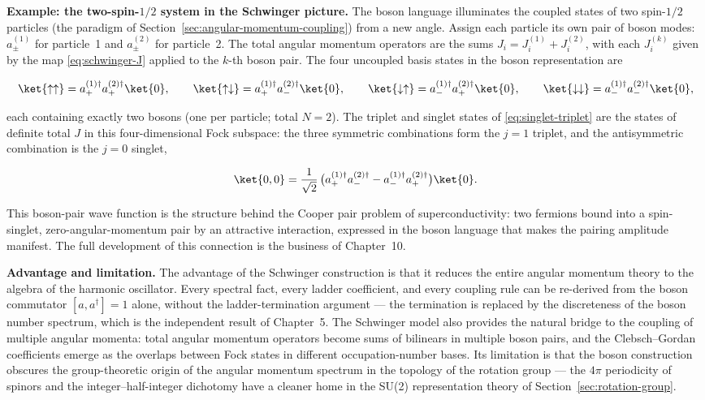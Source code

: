 \medskip\noindent\textbf{Example: the two-spin-$1/2$ system in the Schwinger picture.}
The boson language illuminates the coupled states of two spin-$1/2$ particles (the paradigm of Section~\ref{sec:angular-momentum-coupling}) from a new angle. Assign each particle its own pair of boson modes: $a_\pm^{(1)}$ for particle~1 and $a_\pm^{(2)}$ for particle~2. The total angular momentum operators are the sums $J_i = J_i^{(1)} + J_i^{(2)}$, with each $J_i^{(k)}$ given by the map \eqref{eq:schwinger-J} applied to the $k$-th boson pair. The four uncoupled basis states in the boson representation are
\begin{linenomath}
  \begin{equation*}
    \ket{\uparrow\uparrow} = a_+^{(1)\dagger} a_+^{(2)\dagger}\ket{0},\qquad
    \ket{\uparrow\downarrow} = a_+^{(1)\dagger} a_-^{(2)\dagger}\ket{0},\qquad
    \ket{\downarrow\uparrow} = a_-^{(1)\dagger} a_+^{(2)\dagger}\ket{0},\qquad
    \ket{\downarrow\downarrow} = a_-^{(1)\dagger} a_-^{(2)\dagger}\ket{0},
  \end{equation*}
\end{linenomath}
each containing exactly two bosons (one per particle; total $N = 2$). The triplet and singlet states of \eqref{eq:singlet-triplet} are the states of definite total $J$ in this four-dimensional Fock subspace: the three symmetric combinations form the $j=1$ triplet, and the antisymmetric combination is the $j=0$ singlet,
\begin{linenomath}
  \begin{equation*}
    \ket{0,0} = \frac{1}{\sqrt{2}}\,
      \bigl(a_+^{(1)\dagger} a_-^{(2)\dagger}
          - a_-^{(1)\dagger} a_+^{(2)\dagger}\bigr)\ket{0}.
  \end{equation*}
\end{linenomath}
This boson-pair wave function is the structure behind the Cooper pair problem of superconductivity: two fermions bound into a spin-singlet, zero-angular-momentum pair by an attractive interaction, expressed in the boson language that makes the pairing amplitude manifest. The full development of this connection is the business of Chapter~10.

\medskip\noindent\textbf{Advantage and limitation.}
The advantage of the Schwinger construction is that it reduces the entire angular momentum theory to the algebra of the harmonic oscillator. Every spectral fact, every ladder coefficient, and every coupling rule can be re-derived from the boson commutator $[a,a^\dagger]=1$ alone, without the ladder-termination argument --- the termination is replaced by the discreteness of the boson number spectrum, which is the independent result of Chapter~5. The Schwinger model also provides the natural bridge to the coupling of multiple angular momenta: total angular momentum operators become sums of bilinears in multiple boson pairs, and the Clebsch--Gordan coefficients emerge as the overlaps between Fock states in different occupation-number bases. Its limitation is that the boson construction obscures the group-theoretic origin of the angular momentum spectrum in the topology of the rotation group --- the $4\pi$ periodicity of spinors and the integer--half-integer dichotomy have a cleaner home in the SU(2) representation theory of Section~\ref{sec:rotation-group}.

